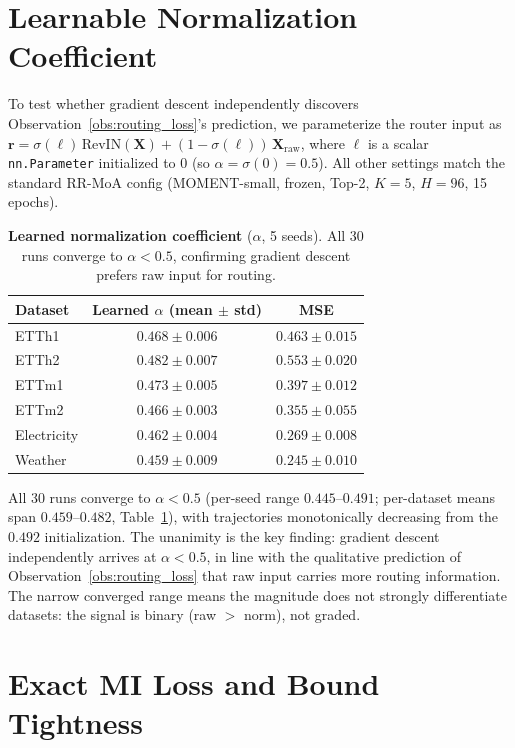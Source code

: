 \documentclass{article}
\begin{document}
\section{Learnable Normalization Coefficient}
\label{app:learnable_alpha}

To test whether gradient descent independently discovers Observation~\ref{obs:routing_loss}'s prediction, we parameterize the router input as $\mathbf{r} = \sigma(\ell)\,\text{RevIN}(\mathbf{X}) + (1 - \sigma(\ell))\,\mathbf{X}_{\text{raw}}$, where $\ell$ is a scalar \texttt{nn.Parameter} initialized to $0$ (so $\alpha = \sigma(0) = 0.5$). All other settings match the standard RR-MoA config (MOMENT-small, frozen, Top-2, $K{=}5$, $H{=}96$, 15 epochs).

\begin{table}[!htbp]
\centering
\caption{\textbf{Learned normalization coefficient} ($\alpha$, 5 seeds). All 30 runs converge to $\alpha < 0.5$, confirming gradient descent prefers raw input for routing.}
\label{tab:learnable_alpha}
\small
\begin{tabular}{@{}lcc@{}}
\toprule
Dataset & Learned $\alpha$ (mean $\pm$ std) & MSE \\
\midrule
ETTh1       & $0.468 \pm 0.006$ & $0.463 \pm 0.015$ \\
ETTh2       & $0.482 \pm 0.007$ & $0.553 \pm 0.020$ \\
ETTm1       & $0.473 \pm 0.005$ & $0.397 \pm 0.012$ \\
ETTm2       & $0.466 \pm 0.003$ & $0.355 \pm 0.055$ \\
Electricity & $0.462 \pm 0.004$ & $0.269 \pm 0.008$ \\
Weather     & $0.459 \pm 0.009$ & $0.245 \pm 0.010$ \\
\bottomrule
\end{tabular}
\end{table}

All 30 runs converge to $\alpha < 0.5$ (per-seed range $0.445$--$0.491$; per-dataset means span $0.459$--$0.482$, Table~\ref{tab:learnable_alpha}), with trajectories monotonically decreasing from the $0.492$ initialization. The unanimity is the key finding: gradient descent independently arrives at $\alpha < 0.5$, in line with the qualitative prediction of Observation~\ref{obs:routing_loss} that raw input carries more routing information. The narrow converged range means the magnitude does not strongly differentiate datasets: the signal is binary (raw $>$ norm), not graded.

\section{Exact MI Loss and Bound Tightness}
\label{app:mi_tightness}
\end{document}
